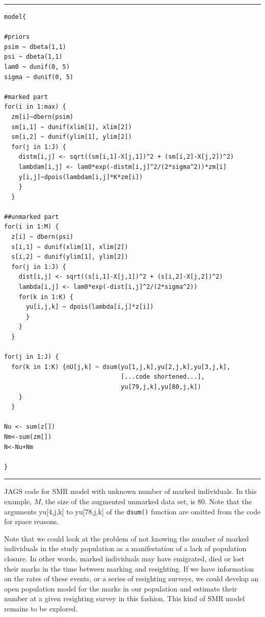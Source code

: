 \begin{panel}[htp]
\centering
\rule[0.15in]{\textwidth}{.03in}
{\small
\begin{verbatim}
model{

#priors
psim ~ dbeta(1,1)
psi ~ dbeta(1,1)
lam0 ~ dunif(0, 5)
sigma ~ dunif(0, 5)

#marked part
for(i in 1:max) {
  zm[i]~dbern(psim)
  sm[i,1] ~ dunif(xlim[1], xlim[2])
  sm[i,2] ~ dunif(ylim[1], ylim[2])
  for(j in 1:J) {
    distm[i,j] <- sqrt((sm[i,1]-X[j,1])^2 + (sm[i,2]-X[j,2])^2)
    lambdam[i,j] <- lam0*exp(-distm[i,j]^2/(2*sigma^2))*zm[i]
    y[i,j]~dpois(lambdam[i,j]*K*zm[i])
    }
  }

##unmarked part
for(i in 1:M) {
  z[i] ~ dbern(psi)
  s[i,1] ~ dunif(xlim[1], xlim[2])
  s[i,2] ~ dunif(ylim[1], ylim[2])
  for(j in 1:J) {
    dist[i,j] <- sqrt((s[i,1]-X[j,1])^2 + (s[i,2]-X[j,2])^2)
    lambda[i,j] <- lam0*exp(-dist[i,j]^2/(2*sigma^2))
    for(k in 1:K) {
      yu[i,j,k] ~ dpois(lambda[i,j]*z[i])
      }
    }
  }

for(j in 1:J) {
  for(k in 1:K) {nU[j,k] ~ dsum(yu[1,j,k],yu[2,j,k],yu[3,j,k],
								[...code shortened...],
								yu[79,j,k],yu[80,j,k])
	}
  }

Nu <- sum(z[])
Nm<-sum(zm[])
N<-Nu+Nm

}
\end{verbatim}
}
\rule[-0.15in]{\textwidth}{.03in}
\caption{
JAGS code for SMR model with unknown number of marked individuals. In this example, $M$, the size of the augmented unmarked data set, is 80. Note that the arguments yu[4,j,k] to yu[78,j,k] of the {\tt dsum()} function are omitted from the code for space reasons.
}
\label{partialID.panel.unknownm}
\end{panel}


Note that we could look at the problem of not knowing the number of marked individuals in the study population as a manifestation of a lack of population closure. In other words, marked individuals may have emigrated, died or lost their marks in the time between marking and resighting. If we have information on the rates of these events, or a series of resighting surveys, we could develop an open population model for the marks in our population and estimate their number at a given resighting survey in this fashion. This kind of SMR model remains to be explored.

